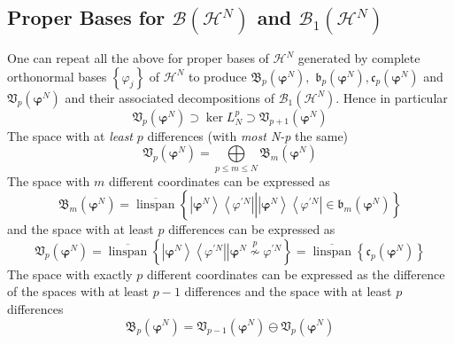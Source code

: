 \documentclass[aps,preprint]{revtex4}%
\begin{document}
\subsection{Proper Bases for $\mathcal{B}\left(  \mathcal{H}^{N}\right)  $ and
$\mathcal{B}_{1}\left(  \mathcal{H}^{N}\right)  $}

One can repeat all the above for proper bases of $\mathcal{H}^{N}$ generated
by complete orthonormal bases $\left\{  \varphi_{j}\right\}  $ of
$\mathcal{H}^{N}$ to produce $\mathfrak{B}_{p}\left(  \mathbf{\varphi}%
^{N}\right)  ,$ $\mathfrak{b}_{p}\left(  \mathbf{\varphi}^{N}\right)
,\mathfrak{c}_{p}\left(  \mathbf{\varphi}^{N}\right)  $ and $\mathfrak{V}%
_{p}\left(  \mathbf{\varphi}^{N}\right)  $ and their associated decompositions
of $\mathcal{B}_{1}\left(  \mathcal{H}^{N}\right)  .$ Hence in particular
\begin{equation}
\mathfrak{V}_{p}\left(  \mathbf{\varphi}^{N}\right)  \supset\ker L_{N}%
^{p}\supset\mathfrak{V}_{p+1}\left(  \mathbf{\varphi}^{N}\right)
\end{equation}
The space with at \emph{least} $p$ differences (with \emph{most N-p} the
same)
\begin{equation}
\mathfrak{V}_{p}\left(  \mathbf{\varphi}^{N}\right)  =%
{\displaystyle\bigoplus\limits_{p\leq m\leq N}}
\mathfrak{B}_{m}\left(  \mathbf{\varphi}^{N}\right)
\end{equation}
The space with $m$ different coordinates can be expressed as
\begin{equation}
\mathfrak{B}_{m}\left(  \mathbf{\varphi}^{N}\right)  =\overline
{\operatorname{linspan}}\left\{  \left.  \underset{}{\left\vert
\mathbf{\varphi}^{N}\right\rangle \left\langle \varphi^{\prime N}\right\vert
}\right\vert \left\vert \mathbf{\varphi}^{N}\right\rangle \left\langle
\varphi^{\prime N}\right\vert \in\mathfrak{b}_{m}\left(  \mathbf{\varphi}%
^{N}\right)  \right\}
\end{equation}
and the space with at least $p$ differences can be expressed as%
\begin{equation}
\mathfrak{V}_{p}\left(  \mathbf{\varphi}^{N}\right)  =\overline
{\operatorname{linspan}}\left\{  \left.  \left\vert \mathbf{\varphi}%
^{N}\right\rangle \left\langle \varphi^{\prime N}\right\vert \overset{}%
{}\right\vert \mathbf{\varphi}^{N}\overset{p}{\nsim}\varphi^{\prime
N}\right\}  =\overline{\operatorname{linspan}}\left\{  \mathfrak{c}_{p}\left(
\mathbf{\varphi}^{N}\right)  \right\}
\end{equation}
The space with exactly $p$ different coordinates can be expressed as the
difference of the spaces with at least $p-1$ differences and the space with at
least $p$ differences
\begin{equation}
\mathfrak{B}_{p}\left(  \mathbf{\varphi}^{N}\right)  =\mathfrak{V}%
_{p-1}\left(  \mathbf{\varphi}^{N}\right)  \ominus\mathfrak{V}_{p}\left(
\mathbf{\varphi}^{N}\right)
\end{equation}
\end{document}
